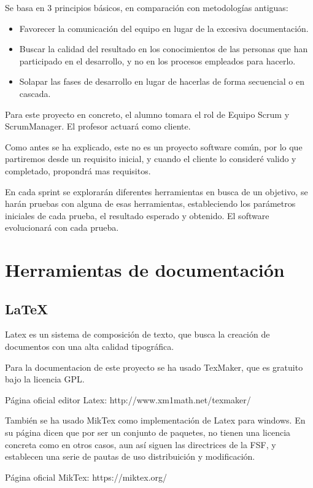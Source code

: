 Se basa en 3 principios básicos, en comparación con metodologías antiguas:
\begin{itemize}
	\item Favorecer la comunicación del equipo en lugar de la excesiva documentación.
	\item Buscar la calidad del resultado en los conocimientos de las personas que han participado en el desarrollo, y no en los procesos empleados para hacerlo.
	\item Solapar las fases de desarrollo en lugar de hacerlas de forma secuencial o en cascada.
\end{itemize}

Para este proyecto en concreto, el alumno tomara el rol de Equipo Scrum y ScrumManager. El profesor actuará como cliente.

Como antes se ha explicado, este no es un proyecto software común, por lo que partiremos desde un requisito inicial, y cuando el cliente lo consideré valido y completado, propondrá mas requisitos.

En cada sprint se explorarán diferentes herramientas en busca de un objetivo, se harán pruebas con alguna de esas herramientas, estableciendo los parámetros iniciales de cada prueba, el resultado esperado y obtenido. El software evolucionará con cada prueba.

\section{Herramientas de documentación}

\subsection{LaTeX}

Latex es un sistema de composición de texto, que busca la creación de documentos con una alta calidad tipográfica.

Para la documentacion de este proyecto se ha usado TexMaker, que es gratuito bajo la licencia GPL.

Página oficial editor Latex: http://www.xm1math.net/texmaker/

También se ha usado MikTex como implementación de Latex para windows. En su página dicen que por ser un conjunto de paquetes, no tienen una licencia concreta como en otros casos, aun así siguen las directrices de la FSF, y establecen una serie de pautas de uso distribuición y modificación.

Página oficial MikTex: https://miktex.org/

